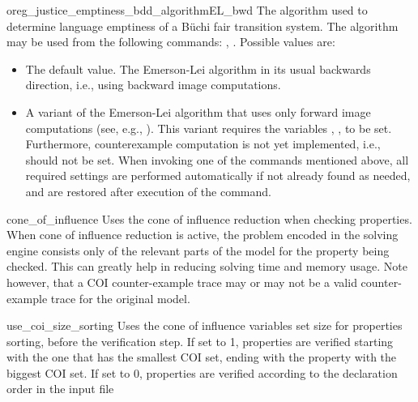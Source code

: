 \begin{nusmvVar} {oreg\_justice\_emptiness\_bdd\_algorithm}{}{EL_bwd}
The algorithm used to determine language emptiness of a B\"uchi fair transition system.
%
The algorithm may be used from the following commands: , . %
%
Possible values are:
\begin{itemize}
\item {} The default value. The Emerson-Lei algorithm \cite{DBLP:conf/lics/EmersonL86} in its usual backwards direction, i.e., using backward image computations.
\item {} A variant of the Emerson-Lei algorithm that uses only forward image computations (see, e.g., \cite{THenzingerOKupfermanSQadeer-FMSD-2003}). This variant requires the variables , ,  to be set. Furthermore, counterexample computation is not yet implemented, i.e.,  should not be set. When invoking one of the commands mentioned above, all required settings are performed automatically if not already found as needed, and are restored after execution of the command.
\end{itemize}
\end{nusmvVar}









\begin{nusmvVar} {cone\_of\_influence}{}{}
Uses the cone of influence reduction when checking properties. When
cone of influence reduction is active, the problem encoded in the
solving engine consists only of the relevant parts of the model for
the property being checked. This can greatly help in reducing solving
time and memory usage.  Note however, that a COI counter-example trace
may or may not be a valid counter-example trace for the original model.
\end{nusmvVar}

\begin{nusmvVar} {use\_coi\_size\_sorting}{}{}
Uses the cone of influence variables set size for properties sorting,
before the verification step. If set to 1, properties are verified
starting with the one that has the smallest COI set, ending with the
property with the biggest COI set. If set to 0, properties are
verified according to the declaration order in the input file
\end{nusmvVar}


